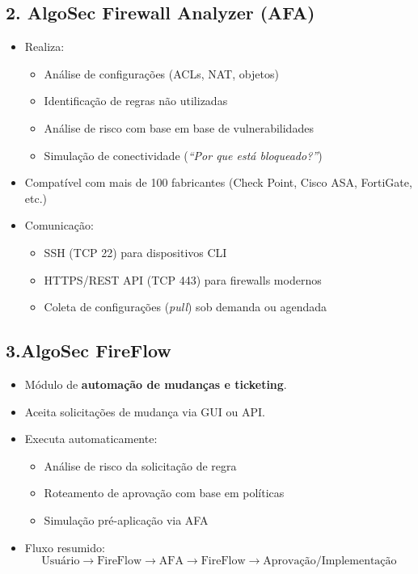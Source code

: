 \documentclass[a4paper,12pt]{article}
\begin{document}
\subsection*{2. AlgoSec Firewall Analyzer (AFA)}
\begin{itemize}[leftmargin=1.5cm]
    \item Realiza:
    \begin{itemize}
        \item Análise de configurações (ACLs, NAT, objetos)
        \item Identificação de regras não utilizadas
        \item Análise de risco com base em base de vulnerabilidades
        \item Simulação de conectividade (\textit{“Por que está bloqueado?”})
    \end{itemize}
    \item Compatível com mais de 100 fabricantes (Check Point, Cisco ASA, FortiGate, etc.)
    \item Comunicação:
    \begin{itemize}
        \item SSH (TCP 22) para dispositivos CLI
        \item HTTPS/REST API (TCP 443) para firewalls modernos
        \item Coleta de configurações (\textit{pull}) sob demanda ou agendada
    \end{itemize}
\end{itemize}

\subsection*{3.AlgoSec FireFlow}
\begin{itemize}[leftmargin=1.5cm]
    \item Módulo de \textbf{automação de mudanças e ticketing}.
    \item Aceita solicitações de mudança via GUI ou API.
    \item Executa automaticamente:
    \begin{itemize}
        \item Análise de risco da solicitação de regra
        \item Roteamento de aprovação com base em políticas
        \item Simulação pré-aplicação via AFA
    \end{itemize}
    \item Fluxo resumido:
    \[
    \text{Usuário} \rightarrow \text{FireFlow} \rightarrow \text{AFA} \rightarrow \text{FireFlow} \rightarrow \text{Aprovação/Implementação}
    \]
\end{itemize}
\end{document}
